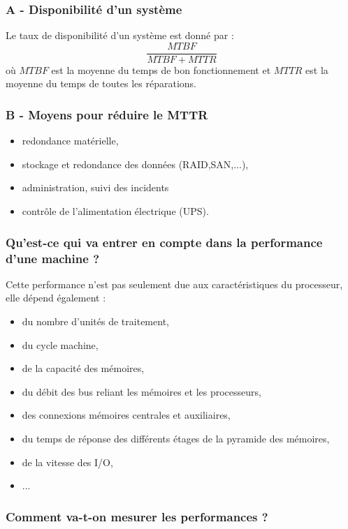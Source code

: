 \documentclass[10pt,a4paper,oneside,titlepage]{report}
\begin{document}
\begin{sffamily}
\subsubsection{A - Disponibilité d'un système}

Le taux de disponibilité d'un système est donné par : $$\frac{MTBF}{MTBF+MTTR}$$ où $MTBF$ est la moyenne du temps de bon fonctionnement et $MTTR$ est la moyenne du temps de toutes les réparations.

\subsubsection{B - Moyens pour réduire le MTTR}

\begin{itemize}
\item redondance matérielle,
\item stockage et redondance des données (RAID,SAN,...),
\item administration, suivi des incidents
\item contr\^ole de l'alimentation électrique (UPS).
\end{itemize}

\subsubsection{Qu'est-ce qui va entrer en compte dans la performance d'une machine ?}

Cette performance n'est pas seulement due aux caractéristiques du processeur, elle dépend également :
\begin{itemize}
\item du nombre d'unités de traitement,
\item du cycle machine,
\item de la capacité des mémoires,
\item du débit des bus reliant les mémoires et les processeurs,
\item des connexions mémoires centrales et auxiliaires,
\item du temps de réponse des différents étages de la pyramide des mémoires,
\item de la vitesse des I/O,
\item ...
\end{itemize}

\subsubsection{Comment va-t-on mesurer les performances ?}


\end{sffamily}
\end{document}
